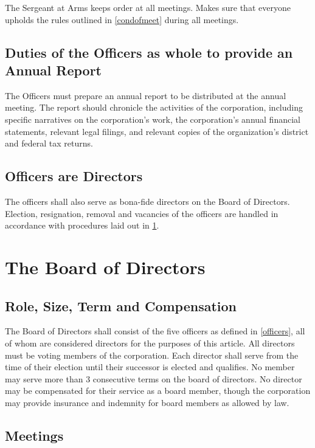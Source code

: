 \documentclass[10pt,letterpaper,titlepage]{article}
\begin{document}
The Sergeant at Arms keeps order at all meetings.
Makes sure that everyone upholds the rules outlined in \ref{condofmeet} during
all meetings.

\subsection{Duties of the Officers as whole to provide an Annual Report}
 
The Officers must prepare an annual report to be distributed at the annual
meeting.
The report should chronicle the activities of the corporation, including
specific narratives on the corporation's work, the corporation's annual
financial statements, relevant legal filings, and relevant copies of the
organization's district and federal tax returns.

\subsection{Officers are Directors}
 
The officers shall also serve as bona-fide directors on the Board of Directors.
Election, resignation, removal and vacancies of the officers are handled in
accordance with procedures laid out in \ref{boardofdirect}.

\section{The Board of Directors}
\label{boardofdirect}

\subsection{Role, Size, Term and Compensation}
 
The Board of Directors shall consist of the five officers as defined in
\ref{officers}, all of whom are considered directors for the purposes of this
article.
All directors must be voting members of the corporation.
Each director shall serve from the time of their election until their successor
is elected and qualifies.
No member may serve more than 3 consecutive terms on the board of directors.
No director may be compensated for their service as a board member, though the
corporation may provide insurance and indemnity for board members as allowed by
law.

\subsection{Meetings}
 
\end{document}

